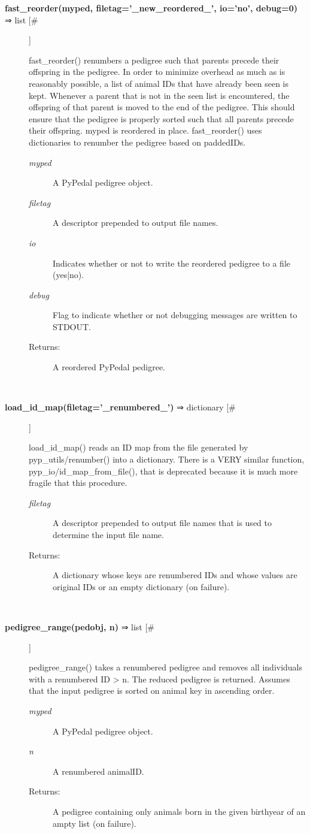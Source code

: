 \documentclass{article}
\begin{document}
\begin{description}
\item[\textbf{fast\_reorder(myped, filetag='\_new\_reordered\_', io='no', debug=0)} ⇒ list [\#]
]
\par fast\_reorder() renumbers a pedigree such that parents precede their offspring in
the pedigree.  In order to minimize overhead as much as is reasonably possible,
a list of animal IDs that have already been seen is kept.  Whenever a parent
that is not in the seen list is encountered, the offspring of that parent is
moved to the end of the pedigree.  This should ensure that the pedigree is
properly sorted such that all parents precede their offspring.  myped is
reordered in place.  fast\_reorder() uses dictionaries to renumber the pedigree
based on paddedIDs.
\begin{description}
\item[\textit{myped}
]
A PyPedal pedigree object.
\item[\textit{filetag}
]
A descriptor prepended to output file names.
\item[\textit{io}
]
Indicates whether or not to write the reordered pedigree to a file (yes|no).
\item[\textit{debug}
]
Flag to indicate whether or not debugging messages are written to STDOUT.
\item[Returns:
]
A reordered PyPedal pedigree.
\end{description}\\

\item[\textbf{load\_id\_map(filetag='\_renumbered\_')} ⇒ dictionary [\#]
]
\par load\_id\_map() reads an ID map from the file generated by pyp\_utils/renumber()
into a dictionary.  There is a VERY similar function, pyp\_io/id\_map\_from\_file(), that
is deprecated because it is much more fragile that this procedure.
\begin{description}
\item[\textit{filetag}
]
A descriptor prepended to output file names that is used to determine the input file name.
\item[Returns:
]
A dictionary whose keys are renumbered IDs and whose values are original IDs or an empty dictionary (on failure).
\end{description}\\

\item[\textbf{pedigree\_range(pedobj, n)} ⇒ list [\#]
]
\par pedigree\_range() takes a renumbered pedigree and removes all individuals
with a renumbered ID > n.  The reduced pedigree is returned.  Assumes that
the input pedigree is sorted on animal key in ascending order.
\begin{description}
\item[\textit{myped}
]
A PyPedal pedigree object.
\item[\textit{n}
]
A renumbered animalID.
\item[Returns:
]
A pedigree containing only animals born in the given birthyear of an ampty list (on failure).
\end{description}\\


\end{description}
\end{document}
